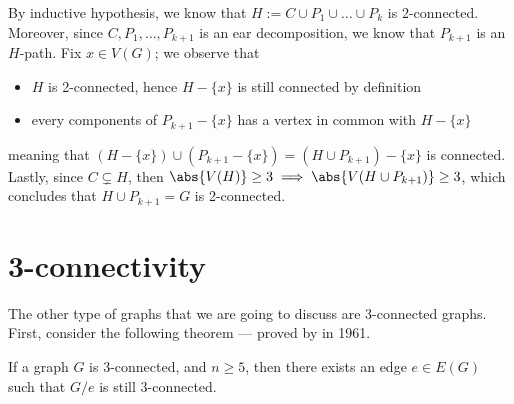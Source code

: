 \documentclass[a4paper, 12pt]{report}
\begin{document}
{        By inductive hypothesis, we know that $H := C \cup P_1 \cup \ldots \cup P_k$ is 2-connected. Moreover, since $C, P_1, \ldots, P_{k + 1}$ is an ear decomposition, we know that $P_{k + 1}$ is an $H$-path. Fix $x \in V(G)$; we observe that

        \begin{itemize}
            \item $H$ is 2-connected, hence $H - \{x\}$ is still connected by definition
            \item every components of $P_{k + 1} - \{x\}$ has a vertex in common with $H - \{x\}$
        \end{itemize}

        meaning that $(H - \{x\}) \cup (P_{k + 1} - \{x\}) = (H \cup P_{k + 1}) - \{x\}$ is connected. Lastly, since $C \subsetneq H$, then $\abs {V(H)} \ge 3 \implies \abs{V(H \cup P_{k  + 1})} \ge 3$, which concludes that $H \cup P_{k + 1} = G$ is 2-connected.
    }

    \section{3-connectivity}

    The other type of graphs that we are going to discuss are 3-connected graphs. First, consider the following theorem --- proved by \textcite{tutte3conn} in 1961.

    \begin{framedthm}[label={tutte decomp}]{}
        If a graph $G$ is 3-connected, and $n \ge 5$, then there exists an edge $e \in E(G)$ such that $G/e$ is still 3-connected.
    \end{framedthm}
\end{document}
